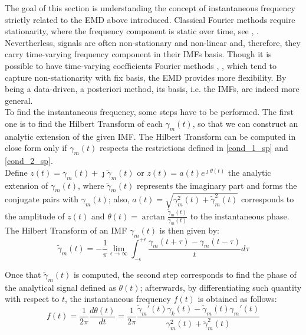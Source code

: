 The goal of this section is understanding the concept of instantaneous frequency strictly related to the EMD above introduced. Classical Fourier methods require stationarity, where the frequency component is static over time, see \cite{Cohen1995}, \cite{Huang1998}. Nevertherless, signals are often non-stationary and non-linear and, therefore, they carry time-varying frequency component in their IMFs basis. Though it is possible to have time-varying  coefficients Fourier methods  \cite{Brigham}, \cite{Cohen1995}, which tend to capture non-stationarity with fix basis, the EMD provides more flexibility. By being a data-driven, a posteriori method, its basis, i.e. the IMFs, are indeed more general.\\
To find the instantaneous frequency, some steps have to be performed. The first one is to find the Hilbert Transform of each $\gamma_m(t)$, so that we can construct an analytic extension of the given IMF. The Hilbert Transform can be computed in close form only if $\gamma_m(t)$ respects the restrictions defined in \ref{cond_1_sp} and \ref{cond_2_sp}.\\
Define $z(t) = \gamma_m(t) + \jmath \tilde{\gamma}_m(t)$ or $z(t) = a(t) e^{\jmath \theta(t)}$ the analytic extension of $\gamma_m(t)$, where  $\tilde{\gamma}_m(t)$ represents the imaginary part and forms the conjugate pairs with $\gamma_m(t)$; also, $a(t) = \sqrt{\gamma_m^2(t)  + \tilde{\gamma}_m^2(t)}$  corresponds to the amplitude of $z(t)$ and $\theta(t) = \arctan \frac{ \tilde{ \gamma}_m(t)}{\gamma_m(t)}$ to the instantaneous phase. The Hilbert Transform of an IMF $\gamma_m (t)$ is then given by:
\begin{equation}
 \label{H_T}
 \tilde{\gamma}_m(t) = - \frac{1}{\pi} \lim_{\epsilon \rightarrow \infty} \int_{-\epsilon}^{+\epsilon} \frac{\gamma_m (t +\tau) - \gamma_m(t -\tau)}{t} d \tau
 \end{equation}

Once that $\tilde{\gamma}_m (t)$ is computed, the second step corresponds to find the phase of the analytical signal defined as $\theta(t)$; afterwards, by differentiating such quantity with respect to $t$, the instantaneous frequency $f(t)$ is obtained as follows:
\begin{equation}
\label{IF}
f(t) = \frac{1}{2 \pi} \frac{d \theta(t)}{dt} = \frac{1}{2 \pi}  \frac{\tilde{\gamma}_m'(t) \gamma_k(t) - \tilde{\gamma}_m(t) \gamma_m'(t)}{\gamma_m^2(t) + \tilde{\gamma}_m^2(t)}
\end{equation}

